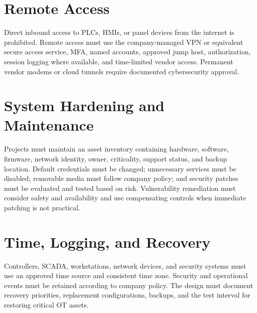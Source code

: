 \section{Remote Access}
Direct inbound access to PLCs, HMIs, or panel devices from the internet is prohibited. Remote access must use the company-managed VPN or equivalent secure access service, MFA, named accounts, approved jump host, authorization, session logging where available, and time-limited vendor access. Permanent vendor modems or cloud tunnels require documented cybersecurity approval.

\section{System Hardening and Maintenance}
Projects must maintain an asset inventory containing hardware, software, firmware, network identity, owner, criticality, support status, and backup location. Default credentials must be changed; unnecessary services must be disabled; removable media must follow company policy; and security patches must be evaluated and tested based on risk. Vulnerability remediation must consider safety and availability and use compensating controls when immediate patching is not practical.

\section{Time, Logging, and Recovery}
Controllers, SCADA, workstations, network devices, and security systems must use an approved time source and consistent time zone. Security and operational events must be retained according to company policy. The design must document recovery priorities, replacement configurations, backups, and the test interval for restoring critical OT assets.
